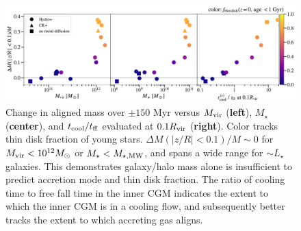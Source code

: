 \documentclass[fleqn,usenatbib]{mnras}
\begin{document}
\begin{figure}
    \centering
    \includegraphics[width=\textwidth]{figures/prevalence/aligned_fraction_vs_galaxy_props.pdf}
    \caption{
    Change in aligned mass over $\pm 150$ Myr versus $M_{\rm vir}$ (\textbf{left}), $M_\star$ (\textbf{center}), and $t_{\rm cool}/t_{\rm ff}$ evaluated at $0.1 R_{\rm vir}$ (\textbf{right}).
    Color tracks thin disk fraction of young stars.
    $\Delta M(\mid z/R \mid<0.1)/M \sim 0$ for $M_{\rm vir} < 10^{12} M_\odot$ or $M_\star < M_{\star, {\rm MW}}$, and spans a wide range for $\sim L_\star$ galaxies.
    This demonstrates galaxy/halo mass alone is insufficient to predict accretion mode and thin disk fraction.
    The ratio of cooling time to free fall time in the inner CGM indicates the extent to which the inner CGM is in a cooling flow, and subsequently better tracks the extent to which accreting gas aligns.
    }
    \label{f: prevalence vs galaxy properties}
\end{figure}


\end{document}
